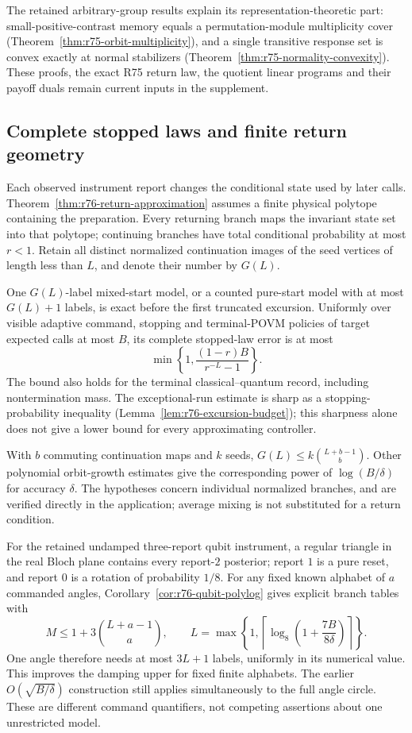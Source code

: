 The retained arbitrary-group results explain its representation-theoretic
part: small-positive-contrast memory equals a permutation-module
multiplicity cover (Theorem~\ref{thm:r75-orbit-multiplicity}), and a
single transitive response set is convex exactly at normal stabilizers
(Theorem~\ref{thm:r75-normality-convexity}). These proofs, the exact
R75 return law, the quotient linear programs and their payoff duals
remain current inputs in the supplement.

\subsection*{Complete stopped laws and finite return geometry}

Each observed instrument report changes the conditional state used by
later calls. Theorem~\ref{thm:r76-return-approximation} assumes a finite
physical polytope containing the preparation. Every returning branch
maps the invariant state set into that polytope; continuing branches
have total conditional probability at most $r<1$. Retain all distinct
normalized continuation images of the seed vertices of length less
than $L$, and denote their number by $G(L)$.

One $G(L)$-label mixed-start model, or a counted pure-start model with
at most $G(L)+1$ labels, is exact before the first truncated excursion.
Uniformly over visible adaptive command, stopping and terminal-POVM
policies of target expected calls at most $B$, its complete stopped-law
error is at most
\begin{equation}\label{eq:r76-intro-excursion}
 \min\left\{1,\frac{(1-r)B}{r^{-L}-1}\right\}.
\end{equation}
The bound also holds for the terminal classical--quantum record,
including nontermination mass. The exceptional-run estimate is sharp
as a stopping-probability inequality
(Lemma~\ref{lem:r76-excursion-budget}); this sharpness alone does not
give a lower bound for every approximating controller.

With $b$ commuting continuation maps and $k$ seeds,
$G(L)\le k\binom{L+b-1}{b}$. Other polynomial orbit-growth estimates
give the corresponding power of $\log(B/\delta)$ for accuracy $\delta$.
The hypotheses concern individual normalized branches, and are
verified directly in the application; average mixing is not
substituted for a return condition.

For the retained undamped three-report qubit instrument, a regular
triangle in the real Bloch plane contains every report-$2$ posterior;
report $1$ is a pure reset, and report $0$ is a rotation of probability
$1/8$. For any fixed known alphabet of $a$ commanded angles,
Corollary~\ref{cor:r76-qubit-polylog} gives explicit branch tables with
\[
 M\le1+3\binom{L+a-1}{a},\qquad
 L=\max\left\{1,\left\lceil
       \log_8\left(1+\frac{7B}{8\delta}\right)\right\rceil\right\}.
\]
One angle therefore needs at most $3L+1$ labels, uniformly in its
numerical value. This improves the damping upper for fixed finite
alphabets. The earlier $O(\sqrt{B/\delta})$ construction still applies
simultaneously to the full angle circle. These are different command
quantifiers, not competing assertions about one unrestricted model.

